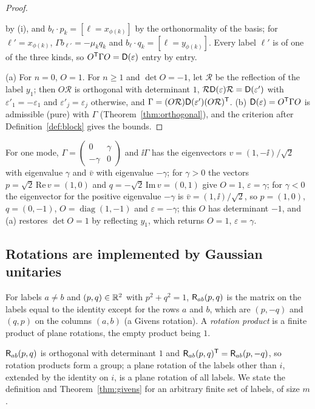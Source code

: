 \begin{proof}
\begin{enumerate}
by (i), and $b_\ell\cdot p_k=[\ell=x_{\phi(k)}]$ by the orthonormality of the basis; for
$\ell'=x_{\phi(k)}$, $\Gamma b_{\ell'}=-\mu_kq_k$ and $b_\ell\cdot q_k=[\ell=y_{\phi(k)}]$. Every
label $\ell'$ is of one of the three kinds, so $O^{\mathsf T}\Gamma O=\mathsf D(\varepsilon)$ entry by entry.
\end{enumerate}
(a) For $n=0$, $O=1$. For $n\geq1$ and $\det O=-1$, let $\mathcal R$ be the reflection of the
label $y_1$; then $O\mathcal R$ is orthogonal with determinant $1$,
$\mathcal R\mathsf D(\varepsilon)\mathcal R=\mathsf D(\varepsilon')$ with $\varepsilon'_1=-\varepsilon_1$ and
$\varepsilon'_j=\varepsilon_j$ otherwise, and $\Gamma=(O\mathcal R)\mathsf D(\varepsilon')(O\mathcal R)^{\mathsf T}$.
(b) $\mathsf D(\varepsilon)=O^{\mathsf T}\Gamma O$ is admissible (pure) with $\Gamma$
(Theorem~\ref{thm:orthogonal}), and the criterion after Definition~\ref{def:block} gives the
bounds.
\end{proof}
For one mode, $\Gamma=\begin{pmatrix}0&\gamma\\-\gamma&0\end{pmatrix}$ and
$\ii\Gamma$ has the eigenvectors $v=(1,-\ii)/\sqrt2$ with eigenvalue $\gamma$ and $\bar v$
with eigenvalue $-\gamma$; for $\gamma>0$ the vectors $p=\sqrt2\,\mathrm{Re}\,v=(1,0)$ and
$q=-\sqrt2\,\mathrm{Im}\,v=(0,1)$ give $O=1$, $\varepsilon=\gamma$; for $\gamma<0$ the
eigenvector for the positive eigenvalue $-\gamma$ is $\bar v=(1,\ii)/\sqrt2$, so $p=(1,0)$,
$q=(0,-1)$, $O=\operatorname{diag}(1,-1)$ and $\varepsilon=-\gamma$; this $O$ has determinant
$-1$, and (a) restores $\det O=1$ by reflecting $y_1$, which returns $O=1$, $\varepsilon=\gamma$.

\subsection{Rotations are implemented by Gaussian unitaries}
\label{sec:rotation}

\begin{definition}\label{def:plane}
For labels $a\neq b$ and $(p,q)\in\mathbb R^2$ with $p^2+q^2=1$, $\mathsf R_{ab}(p,q)$ is the matrix on the
labels equal to the identity except for the rows $a$ and $b$, which are $(p,-q)$ and $(q,p)$
on the columns $(a,b)$ (a Givens rotation). A \emph{rotation product} is a finite product of
plane rotations, the empty product being $1$.
\end{definition}
$\mathsf R_{ab}(p,q)$ is orthogonal with determinant $1$ and $\mathsf R_{ab}(p,q)^{\mathsf T}=\mathsf R_{ab}(p,-q)$, so
rotation products form a group; a plane rotation of the labels other than $i$, extended by
the identity on $i$, is a plane rotation of all labels. We state the definition and
Theorem~\ref{thm:givens} for an arbitrary finite set of labels, of size $m$.

